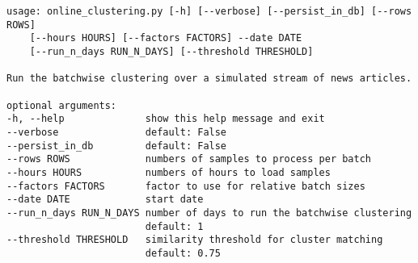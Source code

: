 \begin{lstlisting}[caption=Command line interface for the online clustering, label={lst:cli_online_clustering}]
usage: online_clustering.py [-h] [--verbose] [--persist_in_db] [--rows ROWS]
    [--hours HOURS] [--factors FACTORS] --date DATE
    [--run_n_days RUN_N_DAYS] [--threshold THRESHOLD]

Run the batchwise clustering over a simulated stream of news articles.

optional arguments:
-h, --help              show this help message and exit
--verbose               default: False
--persist_in_db         default: False
--rows ROWS             numbers of samples to process per batch
--hours HOURS           numbers of hours to load samples
--factors FACTORS       factor to use for relative batch sizes
--date DATE             start date
--run_n_days RUN_N_DAYS number of days to run the batchwise clustering
                        default: 1
--threshold THRESHOLD   similarity threshold for cluster matching
                        default: 0.75

\end{lstlisting}
